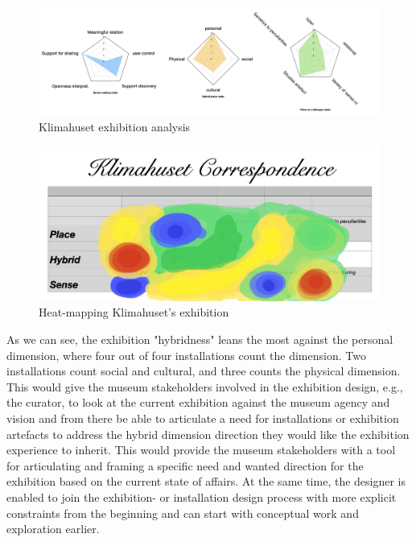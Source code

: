 \begin{figure}[H]
    \centering 
    \includegraphics[width=13cm]{pictures/analysis/klimahuset_analysis_radars.png}
    \caption{Klimahuset exhibition analysis}
\end{figure}

\begin{figure}[H]
    \centering 
    \includegraphics[width=13cm]{pictures/analysis/klimahuset_heat.png}
    \caption{Heat-mapping Klimahuset's exhibition}
\end{figure}

As we can see, the exhibition "hybridness" leans the most against the personal dimension, where four out of four installations count the dimension. Two installations count social and cultural, and three counts the physical dimension. This would give the museum stakeholders involved in the exhibition design, e.g., the curator, to look at the current exhibition against the museum agency and vision and from there be able to articulate a need for installations or exhibition artefacts to address the hybrid dimension direction they would like the exhibition experience to inherit. This would provide the museum stakeholders with a tool for articulating and framing a specific need and wanted direction for the exhibition based on the current state of affairs. At the same time, the designer is enabled to join the exhibition- or installation design process with more explicit constraints from the beginning and can start with conceptual work and exploration earlier.


